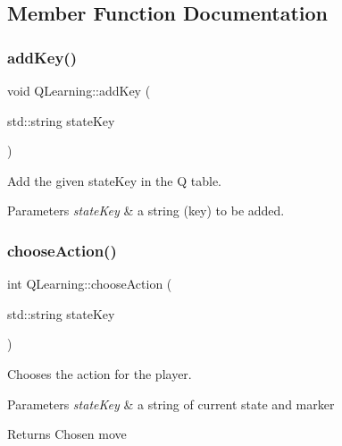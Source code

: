 \subsection{Member Function Documentation}
\mbox{\label{classQLearning_ad87221dd6ac78bca0960e4a367774745}} 
\subsubsection{\texorpdfstring{add\+Key()}{addKey()}}
{\footnotesize\ttfamily void Q\+Learning\+::add\+Key (\begin{DoxyParamCaption}\item[{std\+::string}]{state\+Key }\end{DoxyParamCaption})}



Add the given state\+Key in the Q table. 


\begin{DoxyParams}{Parameters}
{\em state\+Key} & a string (key) to be added. \\
\hline
\end{DoxyParams}
\mbox{\label{classQLearning_ab3c02f950f417a08a7360779d05145e2}} 
\subsubsection{\texorpdfstring{choose\+Action()}{chooseAction()}}
{\footnotesize\ttfamily int Q\+Learning\+::choose\+Action (\begin{DoxyParamCaption}\item[{std\+::string}]{state\+Key }\end{DoxyParamCaption})}



Chooses the action for the player. 


\begin{DoxyParams}{Parameters}
{\em state\+Key} & a string of current state and marker \\
\hline
\end{DoxyParams}
\begin{DoxyReturn}{Returns}
Chosen move 
\end{DoxyReturn}
\mbox{\label{classQLearning_ae2fc8cc1e5c59d2eea29d2d754e2a61f}} 
